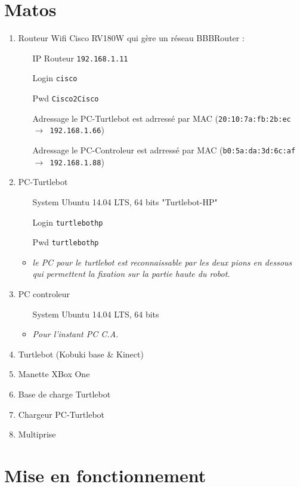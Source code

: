 \documentclass[11pt, a4paper,notitlepage]{article}
\begin{document}
\section*{Matos}
\begin{enumerate}
  \item Routeur Wifi Cisco RV180W qui gère un réseau BBBRouter :
  \begin{itemize}
    \item[IP Routeur] \texttt{192.168.1.11}
    \item[Login] \texttt{cisco}
    \item[Pwd] \texttt{Cisco2Cisco}
    \item[Adressage] le PC-Turtlebot est adrressé par MAC (\texttt{20:10:7a:fb:2b:ec $\rightarrow$ 192.168.1.66})
    \item[Adressage] le PC-Controleur est adrressé par MAC (\texttt{b0:5a:da:3d:6c:af $\rightarrow$ 192.168.1.88})
  \end{itemize}
  \item PC-Turtlebot
  \begin{itemize}
    \item[System] Ubuntu 14.04 LTS, 64 bits "Turtlebot-HP"
    \item[Login] \texttt{turtlebothp}
    \item[Pwd] \texttt{turtlebothp}
    \item \emph{le PC pour le turtlebot est reconnaissable par les deux pions en dessous qui permettent la fixation sur la partie haute du robot.}
  \end{itemize}
  \item PC controleur
  \begin{itemize}
    \item[System] Ubuntu 14.04 LTS, 64 bits
    \item \emph{Pour l'instant PC C.A.}
  \end{itemize}
  \item Turtlebot (Kobuki base \& Kinect)
  \item Manette XBox One
  \item Base de charge Turtlebot
  \item Chargeur PC-Turtlebot
  \item Multiprise
\end{enumerate}

\section{Mise en fonctionnement}\label{st:bringup}
\end{document}
